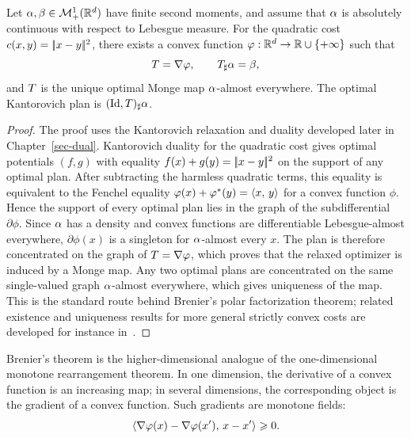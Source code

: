 \begin{thm}[Brenier]\label{thm-brenier}
	Let $\alpha,\beta\in\mathcal{M}_+^1(\mathbb{R}^d)$ have finite second moments, and assume that $\alpha$ is absolutely continuous with respect to Lebesgue measure. For the quadratic cost $c(x,y)=|\!| x-y |\!|^2$, there exists a convex function $\varphi:\mathbb{R}^d\to\mathbb{R}\cup\{+\infty\}$ such that
	\[
		T=\nabla\varphi,
		\qquad
		T_\sharp\alpha=\beta,
	\]
	and $T$ is the unique optimal Monge map $\alpha$-almost everywhere. The optimal Kantorovich plan is $(\mathrm{Id},T)_\sharp\alpha$.
\end{thm}
\begin{proof}
	The proof uses the Kantorovich relaxation and duality developed later in Chapter~\ref{sec-dual}. Kantorovich duality for the quadratic cost gives optimal potentials $(f,g)$ with equality $f(x)+g(y)=|\!| x-y |\!|^2$ on the support of any optimal plan. After subtracting the harmless quadratic terms, this equality is equivalent to the Fenchel equality $\varphi(x)+\varphi^*(y)=\langle x,\,y\rangle$ for a convex function $\phi$. Hence the support of every optimal plan lies in the graph of the subdifferential $\partial\phi$. Since $\alpha$ has a density and convex functions are differentiable Lebesgue-almost everywhere, $\partial\phi(x)$ is a singleton for $\alpha$-almost every $x$. The plan is therefore concentrated on the graph of $T=\nabla\varphi$, which proves that the relaxed optimizer is induced by a Monge map. Any two optimal plans are concentrated on the same single-valued graph $\alpha$-almost everywhere, which gives uniqueness of the map. This is the standard route behind Brenier's polar factorization theorem; related existence and uniqueness results for more general strictly convex costs are developed for instance in~\cite{gangbo1996geometry,caffarelli2002constructing,Villani09}.
\end{proof}

Brenier's theorem is the higher-dimensional analogue of the one-dimensional monotone rearrangement theorem. In one dimension, the derivative of a convex function is an increasing map; in several dimensions, the corresponding object is the gradient of a convex function. Such gradients are monotone fields:
\[
	\langle \nabla\varphi(x)-\nabla\varphi(x'),\,x-x'\rangle\geqslant0.
\]

